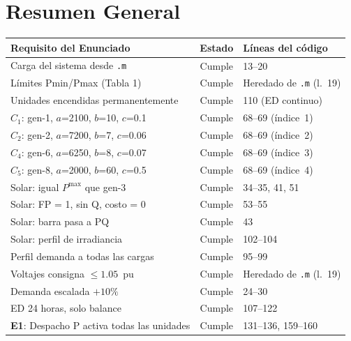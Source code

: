 \documentclass[12pt, a4paper]{article}
\begin{document}
\section{Resumen General}

\begin{table}[h!]
\centering
\renewcommand{\arraystretch}{1.3}
\begin{tabular}{p{} c p{}}
\toprule
\textbf{Requisito del Enunciado} & \textbf{Estado} & \textbf{Líneas del código} \\
\midrule
Carga del sistema desde \texttt{.m} & \textcolor{okgreen}{Cumple} & 13--20 \\
Límites Pmin/Pmax (Tabla 1) & \textcolor{okgreen}{Cumple} & Heredado de \texttt{.m} (l.~19) \\
Unidades encendidas permanentemente & \textcolor{okgreen}{Cumple} & 110 (ED continuo) \\
$C_1$: gen-1, $a$=2100, $b$=10, $c$=0.1 & \textcolor{okgreen}{Cumple} & 68--69 (índice~1) \\
$C_2$: gen-2, $a$=7200, $b$=7, $c$=0.06 & \textcolor{okgreen}{Cumple} & 68--69 (índice~2) \\
$C_4$: gen-6, $a$=6250, $b$=8, $c$=0.07 & \textcolor{okgreen}{Cumple} & 68--69 (índice~3) \\
$C_5$: gen-8, $a$=2000, $b$=60, $c$=0.5 & \textcolor{okgreen}{Cumple} & 68--69 (índice~4) \\
Solar: igual $P^\text{max}$ que gen-3 & \textcolor{okgreen}{Cumple} & 34--35, 41, 51 \\
Solar: FP = 1, sin Q, costo = 0 & \textcolor{okgreen}{Cumple} & 53--55 \\
Solar: barra pasa a PQ & \textcolor{okgreen}{Cumple} & 43 \\
Solar: perfil de irradiancia & \textcolor{okgreen}{Cumple} & 102--104 \\
Perfil demanda a todas las cargas & \textcolor{okgreen}{Cumple} & 95--99 \\
Voltajes consigna $\leq 1.05$~pu & \textcolor{okgreen}{Cumple} & Heredado de \texttt{.m} (l.~19) \\
Demanda escalada $+10\%$ & \textcolor{okgreen}{Cumple} & 24--30 \\
ED 24 horas, solo balance & \textcolor{okgreen}{Cumple} & 107--122 \\
\textbf{E1}: Despacho P activa todas las unidades & \textcolor{okgreen}{Cumple} & 131--136, 159--160 \\

\end{tabular}
\end{table}
\end{document}

